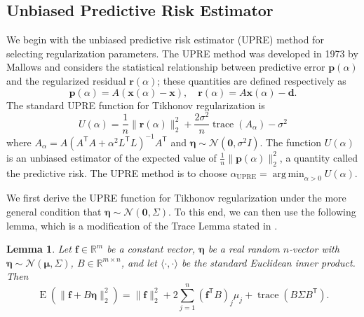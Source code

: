 \documentclass[12pt]{article}
\newcommand{\dVec}{\mathbf{d}}	%
\newcommand{\pVec}{\mathbf{p}}	%
\newcommand{\rVec}{\mathbf{r}}	%
\newcommand{\fVec}{\mathbf{f}}	%
\newcommand{\xVec}{\mathbf{x}}	%
\newcommand{\trans}[1]{{#1}^\mathsf{T}}	%
\DeclareMathOperator{\trace}{trace}		%
\newcommand{\regparam}{\alpha}
\newcommand{\xReg}{\xVec(\regparam)}	%
\newcommand{\xSol}{\xVec}	%
\DeclareMathOperator*{\argmin}{arg\,min}
\newcommand{\noise}{\eta}	%
\newcommand{\noiseSD}{\sigma}	%
\newcommand{\noiseVec}{\bm{\noise}}	%
\DeclareMathOperator{\E}{E}	%
\newcommand{\A}{A_{\regparam}}	%
\newcommand{\U}{U}	%
\newtheorem{lemma}{Lemma}[section]
\begin{document}
\subsection{Unbiased Predictive Risk Estimator} \label{sec:UPRE}
We begin with the unbiased predictive risk estimator (UPRE) method for selecting regularization parameters. The UPRE method was developed in 1973 by Mallows \cite{Mallows1973} and considers the statistical relationship between predictive error $\pVec(\regparam)$ and the regularized residual $\rVec(\regparam)$; these quantities are defined respectively as
\begin{equation}
\label{eq:Predictive Error and Regularized Residual}
\pVec(\regparam) = A(\xReg - \xSol), \quad \rVec(\regparam) = A\xReg - \dVec.
\end{equation}
The standard UPRE function for Tikhonov regularization is
\begin{equation}
\label{eq:UPRE}
\U(\alpha) = \frac{1}{n}\|\rVec(\regparam)\|_2^2 + \frac{2\noiseSD^2}{n}\trace(A_\regparam) - \noiseSD^2
\end{equation}
where $\A = A(\trans{A}A + \regparam^2\trans{L}L)^{-1}\trans{A}$ and $\noiseVec \sim \mathcal{N}(\bm{0},\noiseSD^2I)$. The function $\U(\regparam)$ is an unbiased estimator of the expected value of $\frac{1}{n}\|\pVec(\regparam)\|_2^2$, a quantity called the predictive risk. The UPRE method is to choose $\regparam_{\textrm{UPRE}} = \argmin_{\regparam > 0} \U(\regparam)$. \par
We first derive the UPRE function for Tikhonov regularization under the more general condition that $\noiseVec \sim \mathcal{N}(\bm{0},\Sigma)$. To this end, we can then use the following lemma, which is a modification of the Trace Lemma stated in \cite[p.~98]{Vogel:2002}.
\begin{lemma}
\label{lem:Generalized Trace Lemma}
Let $\fVec \in \mathbb{R}^m$ be a constant vector, $\noiseVec$ be a real random $n$-vector with $\noiseVec \sim \mathcal{N}(\bm{\mu},\Sigma)$, $B \in \mathbb{R}^{m \times n}$, and let $\langle \cdot,\cdot \rangle$ be the standard Euclidean inner product. Then
\[\E(\|\fVec + B\noiseVec\|_2^2) = \|\fVec\|_2^2 + 2\sum_{j=1}^{n} (\trans{\fVec}B)_j \mu_j + \trace\left(B\Sigma\trans{B}\right).\]
\end{lemma}
\end{document}
